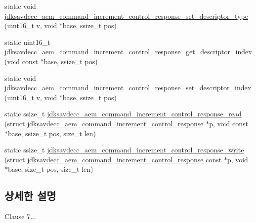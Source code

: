 \begin{DoxyCompactItemize}
static void \hyperlink{group__command__increment__control__response_gae72f684f142ad9e05a1facc23f51c569}{jdksavdecc\+\_\+aem\+\_\+command\+\_\+increment\+\_\+control\+\_\+response\+\_\+set\+\_\+descriptor\+\_\+type} (uint16\+\_\+t v, void $\ast$base, ssize\+\_\+t pos)
\item 
static uint16\+\_\+t \hyperlink{group__command__increment__control__response_ga925d8307ee82bc9257191980d1976e95}{jdksavdecc\+\_\+aem\+\_\+command\+\_\+increment\+\_\+control\+\_\+response\+\_\+get\+\_\+descriptor\+\_\+index} (void const $\ast$base, ssize\+\_\+t pos)
\item 
static void \hyperlink{group__command__increment__control__response_ga852c78e8ebe15c4eb3ce79d55906f3c6}{jdksavdecc\+\_\+aem\+\_\+command\+\_\+increment\+\_\+control\+\_\+response\+\_\+set\+\_\+descriptor\+\_\+index} (uint16\+\_\+t v, void $\ast$base, ssize\+\_\+t pos)
\item 
static ssize\+\_\+t \hyperlink{group__command__increment__control__response_ga8af863d55cc02f6b2d59a9b1b4d1c62a}{jdksavdecc\+\_\+aem\+\_\+command\+\_\+increment\+\_\+control\+\_\+response\+\_\+read} (struct \hyperlink{structjdksavdecc__aem__command__increment__control__response}{jdksavdecc\+\_\+aem\+\_\+command\+\_\+increment\+\_\+control\+\_\+response} $\ast$p, void const $\ast$base, ssize\+\_\+t pos, size\+\_\+t len)
\item 
static ssize\+\_\+t \hyperlink{group__command__increment__control__response_ga543f3a3baaacbe8be8d9ef2a2fd87056}{jdksavdecc\+\_\+aem\+\_\+command\+\_\+increment\+\_\+control\+\_\+response\+\_\+write} (struct \hyperlink{structjdksavdecc__aem__command__increment__control__response}{jdksavdecc\+\_\+aem\+\_\+command\+\_\+increment\+\_\+control\+\_\+response} const $\ast$p, void $\ast$base, size\+\_\+t pos, size\+\_\+t len)
\end{DoxyCompactItemize}


\subsection{상세한 설명}
Clause 7... 

